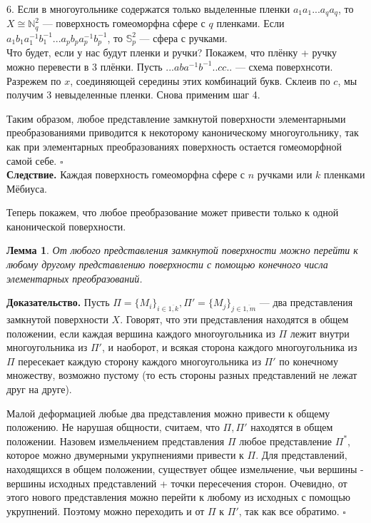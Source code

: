 \documentclass[a4paper]{article}
\newtheorem{lemma}{Лемма}
\begin{document}
6. Если в многоугольнике содержатся только выделенные пленки 
$a_1a_1...a_qa_q$, то $X\cong \mathbb{N}^2_q$ --- поверхность гомеоморфна 
сфере с $q$ пленками.
Если\\ $a_1b_1a_1^{-1}b_1^{-1}...a_pb_pa_p^{-1}b_p^{-1}$, то
$\mathbb{S}^2_p$ --- сфера с ручками.\\
Что будет, если у нас будут пленки и ручки? Покажем, что 
плёнку + ручку можно перевести в 3 плёнки. Пусть $...aba^{-1}b^{-1}..cc..$ 
--- схема поверхнсоти. Разрежем по $x$, соединяющей середины этих 
комбинаций букв. Склеив по  $c$, мы получим 3 невыделенные пленки.
Снова применим шаг 4. 

Таким образом, любое представление замкнутой поверхности 
элементарными преобразованиями приводится к некоторому каноническому
многоугольнику, так как при элементарных преобразованиях поверхность 
остается гомеоморфной самой себе. 
$\square$ \\
\textbf{Следствие.} Каждая поверхность гомеоморфна сфере с $n$ ручками
или  $k$ пленками Мёбиуса. 

Теперь покажем, что любое преобразование может привести только к одной
канонической поверхности.
\begin{lemma}\label{perehod}
    От любого представления замкнутой поверхности можно перейти 
    к любому другому представлению поверхности с помощью конечного числа
    элементарных преобразований. 
\end{lemma}
\textbf{Доказательство.} Пусть $\Pi = \{M_i\}_{i\in \overline{1,k}},
\Pi'=\{M_j\}_{j\in \overline{1,m}}$ --- два 
представления замкнутой поверхности $X$. Говорят, что эти представления
находятся в общем положении, если каждая вершина каждого многоугольника 
из $\Pi$ лежит внутри многоугольника из $\Pi'$, и наоборот, и всякая 
сторона каждого многоугольника из $\Pi$ пересекает каждую сторону 
каждого многоугольника из  $\Pi'$ по конечному множеству, возможно 
пустому (то есть стороны разных представлений не лежат друг на друге). 

Малой деформацией любые два представления можно привести к общему положению. 
Не нарушая общности, считаем, что $\Pi,\Pi'$ находятся в общем положении. 
Назовем измельчением представления $\Pi$ любое представление
$\Pi^*$, которое можно двумерными укрупнениями привести к  $\Pi$. 
Для представлений, находящихся в общем положении, существует общее 
измельчение, чьи вершины - вершины исходных представлений + 
точки пересечения сторон. Очевидно, от этого нового представления можно
перейти к любому из исходных с помощью укрупнений. Поэтому можно 
переходить и от $\Pi$ к  $\Pi'$, так как все обратимо. $\square$
\end{document}
